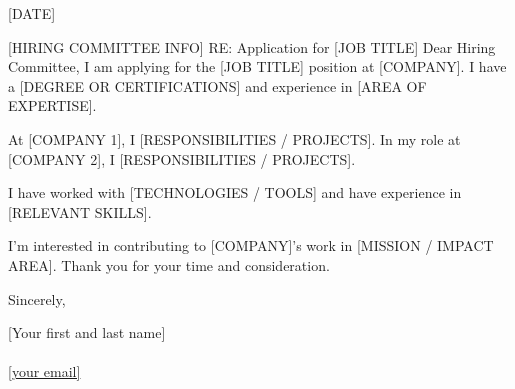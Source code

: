 \documentclass[11pt]{article}
\begin{document}
\pagestyle{empty}
[DATE]

[HIRING COMMITTEE INFO]
RE: Application for [JOB TITLE]
Dear Hiring Committee,
I am applying for the [JOB TITLE] position at [COMPANY]. I have a [DEGREE OR CERTIFICATIONS] and experience in [AREA OF EXPERTISE].

At [COMPANY 1], I [RESPONSIBILITIES / PROJECTS].  
In my role at [COMPANY 2], I [RESPONSIBILITIES / PROJECTS].

I have worked with [TECHNOLOGIES / TOOLS] and have experience in [RELEVANT SKILLS].

I'm interested in contributing to [COMPANY]'s work in [MISSION / IMPACT AREA].  
Thank you for your time and consideration.

Sincerely,

[Your first and last name] \\
[phone number] \\
\href{mailto:[your email]}{[your email]}
\end{document}
